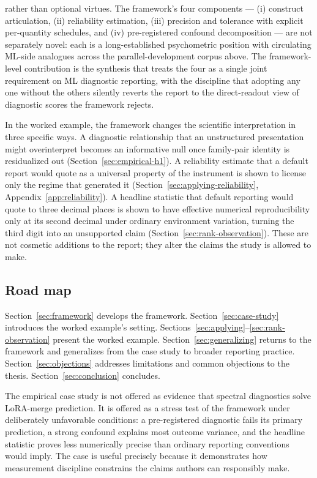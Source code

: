 \documentclass[10pt]{article}
\begin{document}
\begin{enumerate}
    rather than optional virtues. The framework's four components
    --- (i) construct articulation, (ii) reliability estimation,
    (iii) precision and tolerance with explicit per-quantity
    schedules, and (iv) pre-registered confound decomposition ---
    are not separately novel: each is a long-established
    psychometric position with circulating ML-side analogues
    across the parallel-development corpus above. The
    framework-level contribution is the synthesis that treats the
    four as a single joint requirement on ML diagnostic
    reporting, with the discipline that adopting any one without
    the others silently reverts the report to the direct-readout
    view of diagnostic scores the framework rejects.
\end{enumerate}

In the worked example, the framework changes the scientific
interpretation in three specific ways. A diagnostic relationship that
an unstructured presentation might overinterpret becomes an
informative null once family-pair identity is residualized out
(Section~\ref{sec:empirical-h1}). A reliability estimate that a
default report would quote as a universal property of the instrument
is shown to license only the regime that generated it
(Section~\ref{sec:applying-reliability}, Appendix~\ref{app:reliability}).
A headline statistic that default reporting would quote to three
decimal places is shown to have effective numerical reproducibility
only at its second decimal under ordinary environment variation,
turning the third digit into an unsupported claim
(Section~\ref{sec:rank-observation}). These are not cosmetic
additions to the report; they alter the claims the study is allowed
to make.

\subsection{Road map}

Section~\ref{sec:framework} develops the framework.
Section~\ref{sec:case-study} introduces the worked example's setting.
Sections~\ref{sec:applying}--\ref{sec:rank-observation} present the
worked example. Section~\ref{sec:generalizing} returns to the
framework and generalizes from the case study to broader reporting
practice. Section~\ref{sec:objections} addresses limitations and
common objections to the thesis. Section~\ref{sec:conclusion}
concludes.

The empirical case study is not offered as evidence that spectral
diagnostics solve LoRA-merge prediction. It is offered as a stress
test of the framework under deliberately unfavorable conditions: a
pre-registered diagnostic fails its primary prediction, a strong
confound explains most outcome variance, and the headline statistic
proves less numerically precise than ordinary reporting conventions
would imply. The case is useful precisely because it demonstrates
how measurement discipline constrains the claims authors can
responsibly make.
\end{document}
